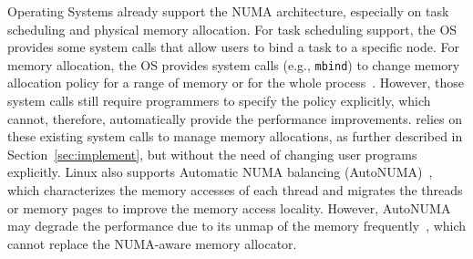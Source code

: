 





Operating Systems already support the NUMA architecture, especially on task scheduling and physical memory allocation. For task scheduling support, the OS provides some system calls that allow users to bind a task to a specific node. For memory allocation, the OS provides system calls (e.g., \texttt{mbind}) to change memory allocation policy for a range of memory or for the whole process~\cite{lameter2013numa, diener2015locality}. However, those system calls still require programmers to specify the policy explicitly, which cannot, therefore, automatically provide the performance improvements. \NM{} relies on these existing system calls to manage memory allocations, as further described in Section~\ref{sec:implement}, but without the need of changing user programs explicitly. Linux also supports Automatic NUMA balancing (AutoNUMA)~\cite{AutoNUMA2}, which characterizes the memory accesses of each thread and migrates the threads or memory pages to improve the memory access locality. However, AutoNUMA may degrade the performance due to its unmap of the memory frequently~\cite{autonumaissue}, which cannot replace the NUMA-aware memory allocator. 

